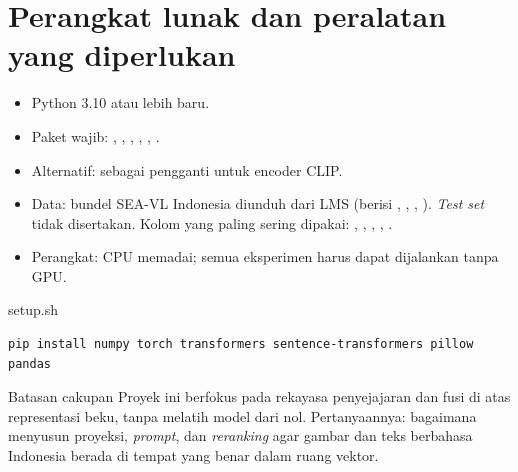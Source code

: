 \documentclass[12pt, a4paper]{article}
\begin{document}
\section{Perangkat lunak dan peralatan yang diperlukan}\label{sec:requiredsw}

\begin{itemize}[itemsep=2pt,parsep=0pt,topsep=2pt,partopsep=2pt]
  \item[\color{ctpBlue}\faPython] Python 3.10 atau lebih baru.
  \item[\color{ctpBlue}\faFileCode] Paket wajib: , , , , , .
  \item[\color{ctpBlue}\faFileCode] Alternatif:  sebagai pengganti  untuk encoder CLIP.
  \item[\color{ctpBlue}\faDownload] Data: bundel SEA-VL Indonesia diunduh dari LMS (berisi , , , ). \emph{Test set} tidak disertakan. Kolom yang paling sering dipakai: , , , , .
  \item[\color{ctpBlue}\faFileCode] Perangkat: CPU memadai; semua eksperimen harus dapat dijalankan tanpa GPU.
\end{itemize}

\begin{codewindow}{setup.sh}
\begin{lstlisting}[style=pycode]
pip install numpy torch transformers sentence-transformers pillow pandas
\end{lstlisting}
\end{codewindow}

\begin{minipage}{\linewidth}
\begin{bclogo}[couleur=ctpMantle, arrondi=0.1, logo=\bcinfo, ombre=false, couleurBord=ctpSurface, epBord=0.6]{Batasan cakupan}
  Proyek ini berfokus pada rekayasa penyejajaran dan fusi di atas representasi beku, tanpa melatih model dari nol. Pertanyaannya: bagaimana menyusun proyeksi, \emph{prompt}, dan \emph{reranking} agar gambar dan teks berbahasa Indonesia berada di tempat yang benar dalam ruang vektor.
\end{bclogo}
\end{minipage}

\end{document}
